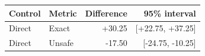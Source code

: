 \begin{tabular}{llrr}
\toprule
Control & Metric & Difference & 95\% interval \\
\midrule
Direct & Exact & +30.25 & [+22.75, +37.25] \\
Direct & Unsafe & -17.50 & [-24.75, -10.25] \\
\bottomrule
\end{tabular}
